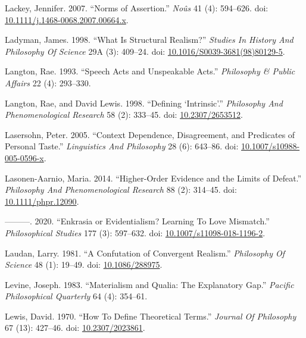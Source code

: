\documentclass[
  10pt,
  letterpaper,
  DIV=11,
  numbers=noendperiod,
  twoside]{scrartcl}
\newlength{\cslhangindent}
\newenvironment{CSLReferences}[2] %
 {\begin{list}{}{%
  \setlength{\itemindent}{0pt}
  \setlength{\leftmargin}{0pt}
  \setlength{\parsep}{0pt}
  \ifodd #1
   \setlength{\leftmargin}{\cslhangindent}
   \setlength{\itemindent}{-1\cslhangindent}
  \fi
  \setlength{\itemsep}{#2\baselineskip}}}
 {\end{list}}
\begin{document}
\begin{CSLReferences}{1}{0}
Lackey, Jennifer. 2007. {``Norms of Assertion.''} \emph{Noûs} 41 (4):
594--626. doi:
\href{https://doi.org/10.1111/j.1468-0068.2007.00664.x}{10.1111/j.1468-0068.2007.00664.x}.

Ladyman, James. 1998. {``What Is Structural Realism?''} \emph{Studies In
History And Philosophy Of Science} 29A (3): 409--24. doi:
\href{https://doi.org/10.1016/S0039-3681(98)80129-5}{10.1016/S0039-3681(98)80129-5}.

Langton, Rae. 1993. {``Speech Acts and Unspeakable Acts.''}
\emph{Philosophy \& Public Affairs} 22 (4): 293--330.

Langton, Rae, and David Lewis. 1998. {``Defining {`Intrinsic'}.''}
\emph{Philosophy And Phenomenological Research} 58 (2): 333--45. doi:
\href{https://doi.org/10.2307/2653512}{10.2307/2653512}.

Lasersohn, Peter. 2005. {``Context Dependence, Disagreement, and
Predicates of Personal Taste.''} \emph{Linguistics And Philosophy} 28
(6): 643--86. doi:
\href{https://doi.org/10.1007/s10988-005-0596-x}{10.1007/s10988-005-0596-x}.

Lasonen-Aarnio, Maria. 2014. {``Higher-Order Evidence and the Limits of
Defeat.''} \emph{Philosophy And Phenomenological Research} 88 (2):
314--45. doi:
\href{https://doi.org/10.1111/phpr.12090}{10.1111/phpr.12090}.

---------. 2020. {``Enkrasia or Evidentialism? Learning To Love
Mismatch.''} \emph{Philosophical Studies} 177 (3): 597--632. doi:
\href{https://doi.org/10.1007/s11098-018-1196-2}{10.1007/s11098-018-1196-2}.

Laudan, Larry. 1981. {``A Confutation of Convergent Realism.''}
\emph{Philosophy Of Science} 48 (1): 19--49. doi:
\href{https://doi.org/10.1086/288975}{10.1086/288975}.

Levine, Joseph. 1983. {``Materialism and Qualia: The Explanatory Gap.''}
\emph{Pacific Philosophical Quarterly} 64 (4): 354--61.

Lewis, David. 1970. {``How To Define Theoretical Terms.''} \emph{Journal
Of Philosophy} 67 (13): 427--46. doi:
\href{https://doi.org/10.2307/2023861}{10.2307/2023861}.


\end{CSLReferences}
\end{document}
